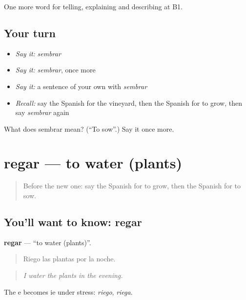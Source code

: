 \begin{grammarlens}[title={What you've built}]
One more word for telling, explaining and describing at B1.
\end{grammarlens}

\subsection*{Your turn}
\begin{itemize}
\raggedright
  \item \emph{Say it:} \emph{sembrar}
  \item \emph{Say it:} \emph{sembrar}, once more
  \item \emph{Say it:} a sentence of your own with \emph{sembrar}
  \item \emph{Recall:} say the Spanish for the vineyard, then the Spanish for to grow, then say \emph{sembrar} again
\end{itemize}

\begin{tcolorbox}[breakable,colback=teal!4,colframe=teal!35!black,title={Before you move on}]
What does sembrar mean? (\textquotedblleft{}To sow\textquotedblright{}.) Say it once more.
\end{tcolorbox}
\section[regar]{regar — to water (plants)}

\label{lesson:ES-C692-regar}



\begin{quote}
Before the new one: say the Spanish for to grow, then the Spanish for to sow.
\end{quote}

\subsection*{You'll want to know: regar}
\textbf{regar} — \textquotedblleft{}to water (plants)\textquotedblright{}.

\begin{quote}
Riego las plantas por la noche.
\end{quote}

\begin{quote}
\emph{I water the plants in the evening.}
\end{quote}

The e becomes ie under stress: \emph{riego}, \emph{riega}.

